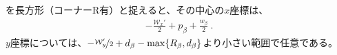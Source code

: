 \clearpage
\EndFaceBoring を長方形（コーナーR有）と捉えると、その中心の$x$座標は、
\begin{align*}
  -\frac{\mathcal W_x'}2+p_\beta+\frac{w_\beta}2\ .
\end{align*}
$y$座標については、$-\nicefrac{\mathcal W_y'}2+d_\beta-\max\{R_\beta, d_\beta\}$より小さい範囲で任意である。